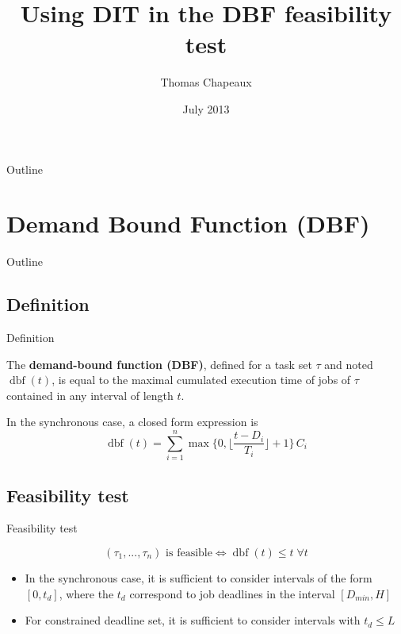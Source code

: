 \documentclass{beamer}
\title {Using DIT in the DBF feasibility test}
\author {Thomas Chapeaux}
\institute {ECE Paris}
\date {July 2013}
\newcommand{\dbf}[1]{\operatorname{dbf}(#1)}
\begin{document}
\begin{frame}
    \titlepage
\end{frame}

\begin{frame}{Outline}
    \tableofcontents
\end{frame}

\section{Demand Bound Function (DBF)}

\begin{frame}{Outline}
    \tableofcontents[currentsection]
\end{frame}

\subsection{Definition}

\begin{frame}{Definition}
    \begin{definition}
    The \textbf{demand-bound function (DBF)}, defined for a task set $\tau$ and noted $\dbf{t}$, is equal to the maximal cumulated execution time of jobs of $\tau$ contained in any interval of length $t$.
    \end{definition}

    In the synchronous case, a closed form expression is $$\dbf{t} = \sum_{i=1}^{n} \operatorname{max} \{ 0, \lfloor \frac{t - D_i}{T_i} \rfloor + 1 \} \, C_i$$
\end{frame}

\subsection{Feasibility test}

\begin{frame}{Feasibility test}
    \begin{theorem}
        $$\text{$(\tau_1, ..., \tau_n)$ is feasible} \iff \dbf{t} \leq t \; \forall t$$
    \end{theorem}

    \begin{itemize}
      \item In the synchronous case, it is sufficient to consider intervals of the form $[0, t_d]$, where the $t_d$ correspond to job deadlines in the interval $\left[ D_{min}, H \right]$
      \item For constrained deadline set, it is sufficient to consider intervals with $t_d \leq L$
    \end{itemize}
\end{frame}
\end{document}
